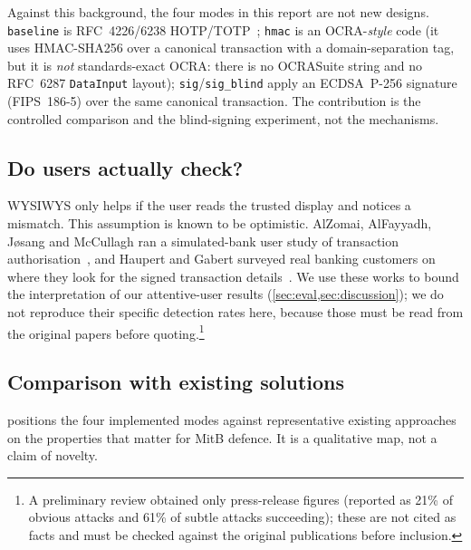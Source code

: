 Against this background, the four modes in this report are not new designs.
\texttt{baseline} is RFC~4226/6238 HOTP/TOTP~\cite{rfc4226,rfc6238};
\texttt{hmac} is an OCRA-\emph{style} code (it uses HMAC-SHA256 over a canonical
transaction with a domain-separation tag, but it is \emph{not} standards-exact
OCRA: there is no OCRASuite string and no RFC~6287 \texttt{DataInput} layout);
\texttt{sig}/\texttt{sig\_blind} apply an ECDSA~P-256 signature (FIPS~186-5) over
the same canonical transaction. The contribution is the controlled comparison
and the blind-signing experiment, not the mechanisms.

\subsection{Do users actually check?}
WYSIWYS only helps if the user reads the trusted display and notices a mismatch.
This assumption is known to be optimistic. AlZomai, AlFayyadh, J\o sang and
McCullagh ran a simulated-bank user study of transaction
authorisation~\cite{alzomai2008}, and Haupert and Gabert surveyed real banking
customers on where they look for the signed transaction
details~\cite{haupert2019}. We use these works to bound the interpretation of
our attentive-user results (\cref{sec:eval,sec:discussion}); we do not reproduce
their specific detection rates here, because those must be read from the
original papers before quoting.\footnote{A preliminary review obtained only
press-release figures (reported as 21\% of obvious attacks and 61\% of subtle
attacks succeeding); these are not cited as facts and must be checked against
the original publications before inclusion.}

\subsection{Comparison with existing solutions}
 positions the four implemented modes against representative
existing approaches on the properties that matter for MitB defence. It is a
qualitative map, not a claim of novelty.


